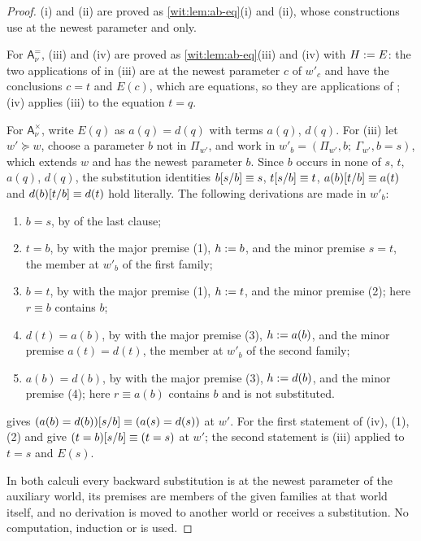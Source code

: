 \begin{proof}
(i) and (ii) are proved as \cref{wit:lem:ab-eq}(i) and (ii), whose
constructions use  at the newest parameter and
 only.

For $\mathsf{A}^{=}_{\nu}$, (iii) and (iv) are proved as
\cref{wit:lem:ab-eq}(iii) and (iv) with $H\mathrel{:=} E$: the two applications of
 in (iii) are at the newest parameter $c$ of $w'_c$ and have
the conclusions $c=t$ and $E(c)$, which are equations, so they are
applications of ; (iv) applies (iii) to the equation $t=q$.

For $\mathsf{A}^{\times}_{\nu}$, write $E(q)$ as $a(q)=d(q)$ with terms
$a(q)$, $d(q)$.  For (iii) let $w'\succeq w$, choose a parameter $b$ not in
$\Pi_{w'}$, and work in $w'_b=(\Pi_{w'},b;\ \Gamma_{w'},b=s)$, which extends
$w$ and has the newest parameter $b$.  Since $b$ occurs in none of $s$, $t$,
$a(q)$, $d(q)$, the substitution identities $b[s/b]\equiv s$,
$t[s/b]\equiv t$, $a(b)[t/b]\equiv a(t)$ and
$d(b)[t/b]\equiv d(t)$ hold literally.  The following derivations are
made in $w'_b$:
\begin{enumerate}[label=\textup{(\arabic*)}]
\item $b=s$, by  of the last clause;
\item $t=b$, by  with the major premise (1), $h\mathrel{:=} b$, and
 the minor premise $s=t$, the member at $w'_b$ of the first family;
\item $b=t$, by  with the major premise (1), $h\mathrel{:=} t$, and
 the minor premise (2); here $r\equiv b$ contains $b$;
\item $d(t)=a(b)$, by  with the major premise (3),
 $h\mathrel{:=} a(b)$, and the minor premise $a(t)=d(t)$, the member at $w'_b$ of
 the second family;
\item $a(b)=d(b)$, by  with the major premise (3),
 $h\mathrel{:=} d(b)$, and the minor premise (4); here $r\equiv a(b)$ contains $b$
 and is not substituted.
\end{enumerate}
 gives $(a(b)=d(b))[s/b]\equiv(a(s)=d(s))$ at $w'$.
For the first statement of (iv), (1), (2) and  give
$(t=b)[s/b]\equiv(t=s)$ at $w'$; the second statement is (iii)
applied to $t=s$ and $E(s)$.

In both calculi every backward substitution is at the newest parameter of
the auxiliary world, its premises are members of the given families at that
world itself, and no derivation is moved to another world or receives a
substitution.  No computation, induction or  is used.
\end{proof}

